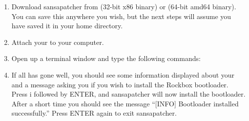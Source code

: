 \begin{enumerate}

\item Download sansapatcher from
 (32-bit x86 
binary) or  
(64-bit amd64 binary). You can save this anywhere you wish, but the next 
steps will assume you have saved it in your home directory.

\item Attach your \dap{} to your computer.

\item Open up a terminal window and type the following commands:



\item If all has gone well, you should see some information displayed about
your \playertype{} and a message asking you if you wish to install the Rockbox
bootloader. Press i followed by ENTER, and sansapatcher will now install the
bootloader. After a short time you should see the message ``[INFO] Bootloader
installed successfully.'' Press ENTER again to exit sansapatcher.
\end{enumerate}
